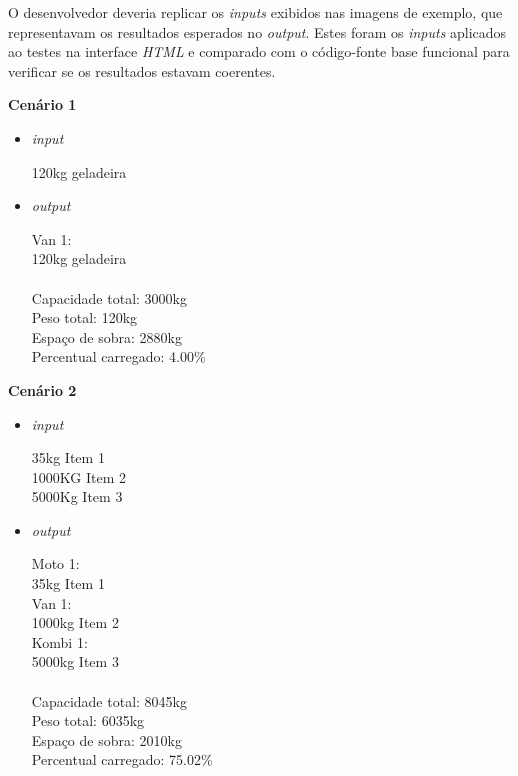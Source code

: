 \documentclass[english,brazilian]{UNISINOSartigo} %
\begin{document}
O desenvolvedor deveria replicar os \textit{inputs} exibidos nas imagens de exemplo, que representavam os resultados esperados no \textit{output}. Estes foram os \textit{inputs} aplicados ao testes na interface \textit{HTML} e comparado com o código-fonte base funcional para verificar se os resultados estavam coerentes.

\textbf{Cenário 1}

\begin{itemize}[leftmargin=1cm, itemsep=0.1em, topsep=0.1em]
    \item \textit{input}
    \begin{itemize}[leftmargin=1.2cm, itemsep=0.1em, topsep=0.1em]
        120kg geladeira
    \end{itemize}
    \item \textit{output}
    \begin{itemize}[leftmargin=1.2cm, itemsep=0.1em, topsep=0.1em]
        Van 1:\\
        120kg geladeira\\
        
        \\Capacidade total: 3000kg\\
        Peso total: 120kg\\
        Espaço de sobra: 2880kg\\
        Percentual carregado: 4.00\%
    \end{itemize}
\end{itemize}

\textbf{Cenário 2}

\begin{itemize}[leftmargin=1cm, itemsep=0.1em, topsep=0.1em]
    \item \textit{input}
    \begin{itemize}[leftmargin=1.2cm, itemsep=0.1em, topsep=0.1em]
        35kg Item 1\\
        1000KG Item 2\\
        5000Kg Item 3
    \end{itemize}
    \item \textit{output}
    \begin{itemize}[leftmargin=1.2cm, itemsep=0.1em, topsep=0.1em]
        Moto 1:\\
        35kg Item 1\\
        Van 1:\\ 
        1000kg Item 2\\
        Kombi 1:\\
        5000kg Item 3\\

        \\Capacidade total: 8045kg\\
        Peso total: 6035kg\\
        Espaço de sobra: 2010kg\\
        Percentual carregado: 75.02\%
    \end{itemize}
\end{itemize}
\end{document}
